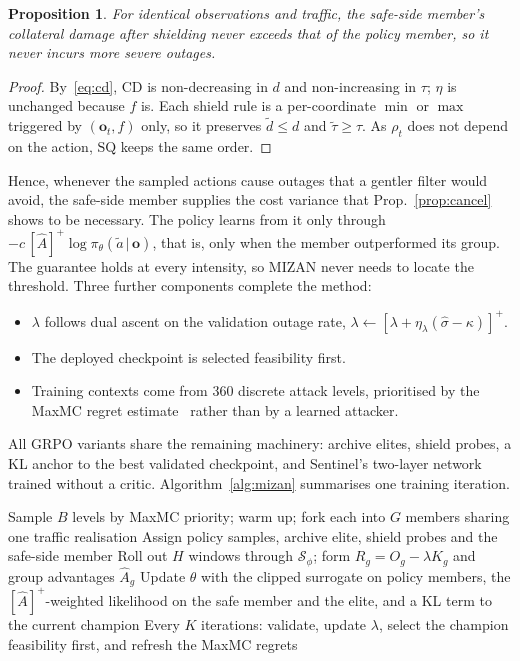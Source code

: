 \documentclass[journal]{IEEEtran}
\newtheorem{proposition}{Proposition}
\begin{document}
\begin{proposition}\label{prop:safe}
For identical observations and traffic, the safe-side member's collateral damage after shielding never exceeds that of the policy member, so it never incurs more severe outages.
\end{proposition}
\begin{proof}
By~\eqref{eq:cd}, $\mathrm{CD}$ is non-decreasing in $d$ and non-increasing in $\tau$; $\eta$ is unchanged because $f$ is. Each shield rule is a per-coordinate $\min$ or $\max$ triggered by $(\mathbf{o}_t,f)$ only, so it preserves $\tilde d\le d$ and $\tilde\tau\ge\tau$. As $\rho_t$ does not depend on the action, $\mathrm{SQ}$ keeps the same order.
\end{proof}

Hence, whenever the sampled actions cause outages that a gentler filter would avoid, the safe-side member supplies the cost variance that Prop.~\ref{prop:cancel} shows to be necessary. The policy learns from it only through $-c\,[\hat A]^+\log\pi_\theta(\tilde a\,|\,\mathbf{o})$, that is, only when the member outperformed its group. The guarantee holds at every intensity, so MIZAN never needs to locate the threshold. Three further components complete the method:
\begin{itemize}
\item $\lambda$ follows dual ascent on the validation outage rate, $\lambda\leftarrow[\lambda+\eta_\lambda(\hat\sigma-\kappa)]^+$.
\item The deployed checkpoint is selected feasibility first.
\item Training contexts come from 360 discrete attack levels, prioritised by the MaxMC regret estimate~\cite{jiang2021robustplr,jiang2021plr} rather than by a learned attacker.
\end{itemize}
All GRPO variants share the remaining machinery: archive elites, shield probes, a KL anchor to the best validated checkpoint, and Sentinel's two-layer network trained without a critic. Algorithm~\ref{alg:mizan} summarises one training iteration.

\begin{algorithm}[t]
\caption{One MIZAN training iteration}
\label{alg:mizan}
\small
\begin{algorithmic}[1]
\STATE Sample $B$ levels by MaxMC priority; warm up; fork each into $G$ members sharing one traffic realisation
\STATE Assign policy samples, archive elite, shield probes and the safe-side member
\STATE Roll out $H$ windows through $\mathcal{S}_\phi$; form $R_g=O_g-\lambda K_g$ and group advantages $\hat A_g$
\STATE Update $\theta$ with the clipped surrogate on policy members, the $[\hat A]^+$-weighted likelihood on the safe member and the elite, and a KL term to the current champion
\STATE Every $K$ iterations: validate, update $\lambda$, select the champion feasibility first, and refresh the MaxMC regrets
\end{algorithmic}
\end{algorithm}
\end{document}

